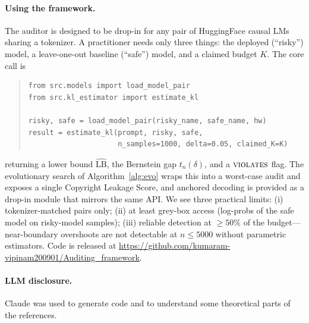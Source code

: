 \documentclass{article}
\begin{document}
\paragraph{Using the framework.}
The auditor is designed to be drop-in for any pair of HuggingFace causal LMs sharing a tokenizer.  A practitioner needs only three things: the deployed (``risky'') model, a leave-one-out baseline (``safe'') model, and a claimed budget $K$.  The core call is
\begin{quote}
\begin{Verbatim}[fontsize=\small]
from src.models import load_model_pair
from src.kl_estimator import estimate_kl

risky, safe = load_model_pair(risky_name, safe_name, hw)
result = estimate_kl(prompt, risky, safe,
                     n_samples=1000, delta=0.05, claimed_K=K)
\end{Verbatim}
\end{quote}
returning a lower bound $\widehat{\mathrm{LB}}$, the Bernstein gap $t_n(\delta)$, and a $\textsc{violates}$ flag.  The evolutionary search of Algorithm~\ref{alg:evo} wraps this into a worst-case audit and exposes a single Copyright Leakage Score, and anchored decoding is provided as a drop-in module that mirrors the same API.  We see three practical limits: (i) tokenizer-matched pairs only; (ii) at least grey-box access (log-probs of the safe model on risky-model samples); (iii) reliable detection at $\ge 50\%$ of the budget---near-boundary overshoots are not detectable at $n{\le}5000$ without parametric estimators.  Code is released at \url{https://github.com/kumaram-vipinam200901/Auditing\_framework}.

\paragraph{LLM disclosure.}
Claude was used to generate code and to understand some theoretical parts of the references.


\end{document}

